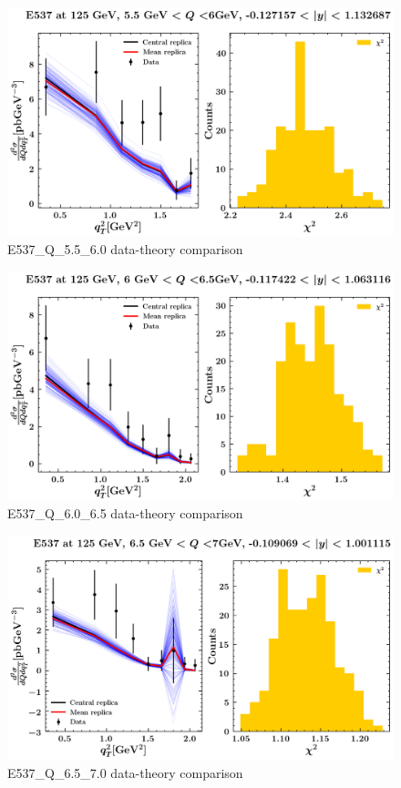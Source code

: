 \documentclass[]{article}
\begin{document}
\begin{figure}
\centering
\includegraphics{pngplots/E537_Q_5.5_6.0.png}
\caption{E537\_Q\_5.5\_6.0 data-theory comparison}
\end{figure}

\begin{figure}
\centering
\includegraphics{pngplots/E537_Q_6.0_6.5.png}
\caption{E537\_Q\_6.0\_6.5 data-theory comparison}
\end{figure}

\begin{figure}
\centering
\includegraphics{pngplots/E537_Q_6.5_7.0.png}
\caption{E537\_Q\_6.5\_7.0 data-theory comparison}
\end{figure}
\end{document}
